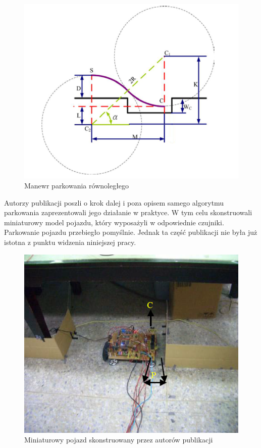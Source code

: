 \documentclass[a4paper,11pt,twoside]{report}
\theoremstyle{definition}
\begin{document}
\begin{figure}[h!]
\centering
\includegraphics[scale=0.34]{parallelParking}
\caption[Manewr parkowania równoległego]{Manewr parkowania równoległego}
\end{figure} 
 
Autorzy publikacji poszli o krok dalej i poza opisem samego algorytmu parkowania zaprezentowali jego działanie w praktyce. W tym celu skonstruowali miniaturowy model pojazdu, który wyposażyli w odpowiednie czujniki. Parkowanie pojazdu przebiegło pomyślnie. Jednak ta część publikacji nie była już istotna z punktu widzenia niniejszej pracy.
 
\begin{figure}[h!]
\centering
\includegraphics[scale=0.7]{miniVehicle}
\caption[Miniaturowy pojazd skonstruowany przez autorów publikacji]{Miniaturowy pojazd skonstruowany przez autorów publikacji}
\end{figure}
\end{document}
